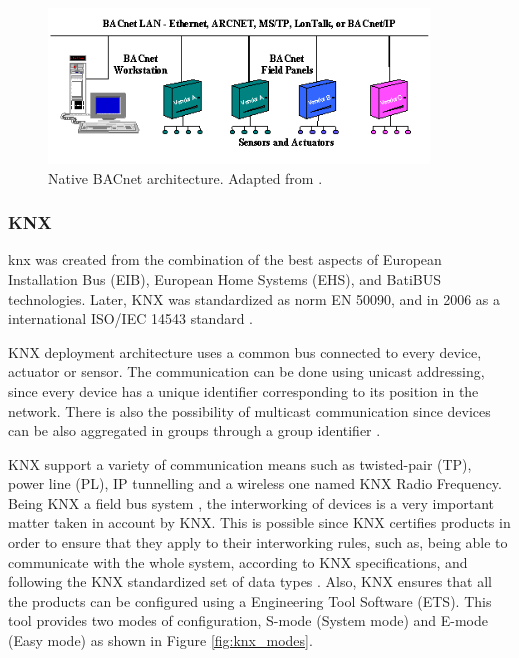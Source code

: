 \begin{figure}[H]
	\centering
	\includegraphics[width=0.9\textwidth]{figures/bacnet.png}
	\caption{Native BACnet architecture. Adapted from \cite{bacnetimage}. }
	\label{fig:bacnet}
\end{figure}


\subsubsection{KNX}

\ac{knx} was created from the combination of the best aspects of European Installation Bus (EIB), European Home Systems (EHS), and BatiBUS technologies. Later, KNX was standardized as norm EN 50090, and in 2006 as a international ISO/IEC 14543 standard \cite{Domingues2016}.

KNX deployment architecture uses a common bus connected to every device, actuator or sensor. The communication can be done using unicast addressing, since every device has a unique identifier corresponding to its position in the network. There is also the possibility of multicast communication since devices can be also aggregated in groups through a group identifier \cite{Kastner2005}.  

KNX support a variety of communication means such as twisted-pair (TP), power line (PL), IP tunnelling and a wireless one named KNX
Radio Frequency. Being KNX a field bus system \cite{Osorio}, the interworking of devices is a very important matter taken in account by KNX. This is possible since KNX certifies products in order to ensure that they apply to their interworking rules, such as, being able to communicate with the whole system, according to KNX specifications, and following the KNX standardized set of data types \cite{Interworking_KNX}. Also, KNX ensures that all the products can be configured using a Engineering Tool Software (ETS). This tool provides two modes of configuration, S-mode (System mode) and E-mode (Easy mode) as shown in Figure \ref{fig:knx_modes}. 

